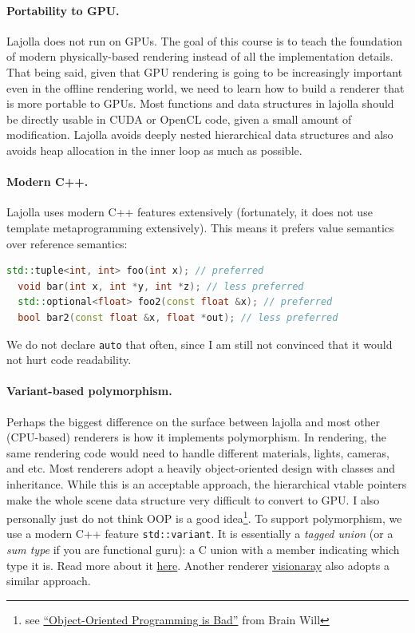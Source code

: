 \paragraph{Portability to GPU.} Lajolla does not run on GPUs. The goal of this course is to teach the foundation of modern physically-based rendering instead of all the implementation details. That being said, given that GPU rendering is going to be increasingly important even in the offline rendering world, we need to learn how to build a renderer that is more portable to GPUs. Most functions and data structures in lajolla should be directly usable in CUDA or OpenCL code, given a small amount of modification. Lajolla avoids deeply nested hierarchical data structures and also avoids heap allocation in the inner loop as much as possible.

\paragraph{Modern C++.} Lajolla uses modern C++ features extensively (fortunately, it does not use template metaprogramming extensively). This means it prefers value semantics over reference semantics:
\begin{lstlisting}[language=C++]
  std::tuple<int, int> foo(int x); // preferred
  void bar(int x, int *y, int *z); // less preferred
  std::optional<float> foo2(const float &x); // preferred
  bool bar2(const float &x, float *out); // less preferred
\end{lstlisting}
We do not declare \lstinline{auto} that often, since I am still not convinced that it would not hurt code readability.

\paragraph{Variant-based polymorphism.} Perhaps the biggest difference on the surface between lajolla and most other (CPU-based) renderers is how it implements polymorphism. In rendering, the same rendering code would need to handle different materials, lights, cameras, and etc. Most renderers adopt a heavily object-oriented design with classes and inheritance. While this is an acceptable approach, the hierarchical vtable pointers make the whole scene data structure very difficult to convert to GPU. I also personally just do not think OOP is a good idea\footnote{see \href{https://www.youtube.com/watch?v=QM1iUe6IofM}{``Object-Oriented Programming is Bad''} from Brain Will}. To support polymorphism, we use a modern C++ feature \lstinline{std::variant}. It is essentially a \emph{tagged union} (or a \emph{sum type} if you are functional guru): a C union with a member indicating which type it is. Read more about it \href{https://www.cppstories.com/2020/04/variant-virtual-polymorphism.html/}{here}. Another renderer \href{https://github.com/szellmann/visionaray}{visionaray} also adopts a similar approach.


